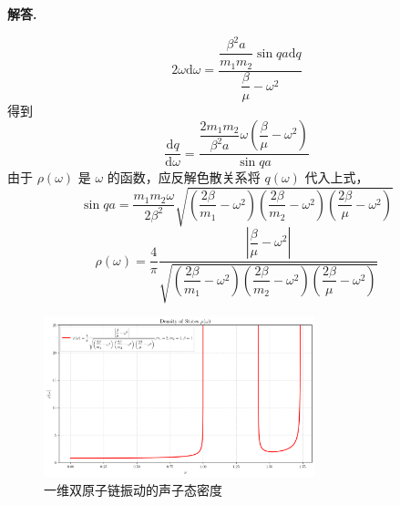 \documentclass[11pt]{ctexart}
\newenvironment{solution}{\par\noindent\textbf{解答. }}{\par}
\begin{document}
\begin{solution}
\begin{enumerate}[(a)]
              $$2\omega\text{d}\omega = \frac{\dfrac{\beta^2a}{m_1m_2}\sin{qa}\text{d}q}{\dfrac{\beta}{\mu}-\omega^2}$$
              得到
              $$\frac{\text{d}q}{\text{d}\omega} = \frac{\dfrac{2m_1m_2}{\beta^2a}\omega\left(\dfrac{\beta}{\mu}-\omega^2\right)}{\sin{qa}}$$
              由于 $\rho(\omega)$ 是 $\omega$ 的函数，应反解色散关系将 $q(\omega)$ 代入上式，
              $$\sin{qa} = \frac{m_1m_2\omega}{2\beta^2}\sqrt{\left(\frac{2\beta}{m_1} - \omega^2\right)\left(\frac{2\beta}{m_2} - \omega^2\right)\left(\frac{2\beta}{\mu} - \omega^2\right)}$$
              $$\rho(\omega) = \frac{4}\pi\frac{\left|\dfrac{\beta}{\mu} - \omega^2\right|}{\sqrt{\left(\dfrac{2\beta}{m_1} - \omega^2\right)\left(\dfrac{2\beta}{m_2} - \omega^2\right)\left(\dfrac{2\beta}{\mu} - \omega^2\right)}}$$
              \begin{figure}[htbp]
                \centering
                \includegraphics[width=0.7\textwidth]{assets/DOS_2.png}
                \caption{一维双原子链振动的声子态密度}
              \end{figure}
    \end{enumerate}
\end{solution}
\end{document}
